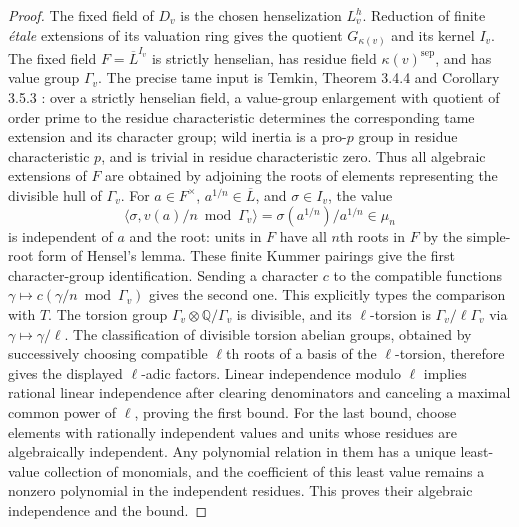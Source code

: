 \begin{proof}
The fixed field of $D_v$ is the chosen henselization $L_v^h$. Reduction of finite \emph{\'etale} extensions of its valuation ring gives the quotient $G_{\kappa(v)}$ and its kernel $I_v$. The fixed field $F=\overline L^{I_v}$ is strictly henselian, has residue field $\kappa(v)^{\mathrm{sep}}$, and has value group $\Gamma_v$.
The precise tame input is Temkin, Theorem 3.4.4 and Corollary 3.5.3 \cite{DE_Temkin}: over a strictly henselian field, a value-group enlargement with quotient of order prime to the residue characteristic determines the corresponding tame extension and its character group; wild inertia is a pro-$p$ group in residue characteristic $p$, and is trivial in residue characteristic zero. Thus all algebraic extensions of $F$ are obtained by adjoining the roots of elements representing the divisible hull of $\Gamma_v$. For $a\in F^\times$, $a^{1/n}\in\overline L$, and $\sigma\in I_v$, the value
\[
 \langle\sigma,v(a)/n\bmod\Gamma_v\rangle
 =\sigma(a^{1/n})/a^{1/n}\in\mu_n
\]
is independent of $a$ and the root: units in $F$ have all $n$th roots in $F$ by the simple-root form of Hensel's lemma. These finite Kummer pairings give the first character-group identification. Sending a character $c$ to the compatible functions
$\gamma\mapsto c(\gamma/n\bmod\Gamma_v)$ gives the second one. This explicitly types the comparison with $T$.
The torsion group $\Gamma_v\otimes\mathbb Q/\Gamma_v$ is divisible, and its $\ell$-torsion is $\Gamma_v/\ell\Gamma_v$ via $\gamma\mapsto\gamma/\ell$. The classification of divisible torsion abelian groups, obtained by successively choosing compatible $\ell$th roots of a basis of the $\ell$-torsion, therefore gives the displayed $\ell$-adic factors. Linear independence modulo $\ell$ implies rational linear independence after clearing denominators and canceling a maximal common power of $\ell$, proving the first bound. For the last bound, choose elements with rationally independent values and units whose residues are algebraically independent. Any polynomial relation in them has a unique least-value collection of monomials, and the coefficient of this least value remains a nonzero polynomial in the independent residues. This proves their algebraic independence and the bound.

\end{proof}
